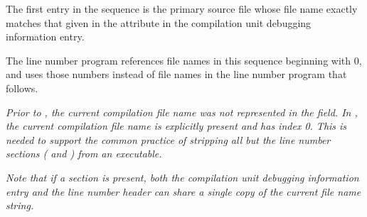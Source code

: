 \begin{enumerate}[1. ]
The first entry in the sequence is the primary source file 
whose file name exactly matches that given in the 
\DWATname{} attribute in the compilation unit 
debugging information entry.
   
The line number program references file names in this 
sequence beginning with 0, and uses those numbers instead 
of file names in the line number program that follows.

\textit{Prior to \DWARFVersionV, the current compilation 
file name was not represented in the 
field. In \DWARFVersionV, the current compilation file name 
is explicitly present and has index 0. This is needed to support 
the common practice of stripping all but the line number sections
(\dotdebugline{} and \dotdebuglinestr) from an executable.}

\textit{Note that if a \dotdebuglinestr{} section is present, 
both the compilation unit debugging information entry 
and the line number header can
share a single copy of the current file name string.}

\end{enumerate}

